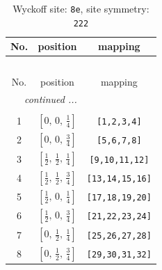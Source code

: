\documentclass[fleqn,8pt]{jsarticle}
\begin{document}
\begin{longtable}{ccc}
\caption{Wyckoff site: {\tt 8e}, site symmetry: {\tt 222}}
 \\
 \hline \hline
No. & position & mapping \\ \hline \endfirsthead

\multicolumn{2}{l}{\tablename\ \thetable{}} \\
 \hline \hline
No. & position & mapping \\ \hline \endhead

 \hline \hline
\multicolumn{2}{r}{\footnotesize\it continued ...} \\ \endfoot

 \hline \hline
\multicolumn{2}{r}{} \\ \endlastfoot

1 & $\left[ 0,\, 0,\, \frac{1}{4} \right]$ & {\tt [1,2,3,4]} \\ \hline
2 & $\left[ 0,\, 0,\, \frac{3}{4} \right]$ & {\tt [5,6,7,8]} \\ \hline
3 & $\left[ \frac{1}{2},\, \frac{1}{2},\, \frac{1}{4} \right]$ & {\tt [9,10,11,12]} \\ \hline
4 & $\left[ \frac{1}{2},\, \frac{1}{2},\, \frac{3}{4} \right]$ & {\tt [13,14,15,16]} \\ \hline
5 & $\left[ \frac{1}{2},\, 0,\, \frac{1}{4} \right]$ & {\tt [17,18,19,20]} \\ \hline
6 & $\left[ \frac{1}{2},\, 0,\, \frac{3}{4} \right]$ & {\tt [21,22,23,24]} \\ \hline
7 & $\left[ 0,\, \frac{1}{2},\, \frac{1}{4} \right]$ & {\tt [25,26,27,28]} \\ \hline
8 & $\left[ 0,\, \frac{1}{2},\, \frac{3}{4} \right]$ & {\tt [29,30,31,32]} \\
\end{longtable}
\renewcommand{\arraystretch}{1.2}
\end{document}
